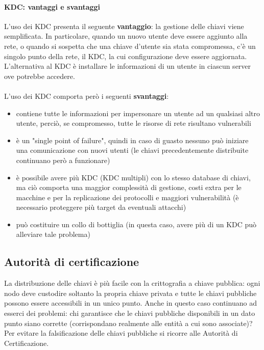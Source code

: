 \paragraph{KDC: vantaggi e svantaggi}
L'uso dei KDC presenta il seguente \textbf{vantaggio}: la gestione delle chiavi viene semplificata. In particolare, quando un nuovo utente deve essere aggiunto alla rete, o quando si sospetta che una chiave d'utente sia stata compromessa, c'è un singolo punto della rete, il KDC, la cui configurazione deve essere aggiornata. L'alternativa al KDC è installare le informazioni di un utente in ciascun server ove potrebbe accedere. \\ \\
L'uso dei KDC comporta però i seguenti \textbf{svantaggi}: 
\begin{itemize}
	\item contiene tutte le informazioni per impersonare un utente ad un qualsiasi altro utente, perciò, se compromesso, tutte le risorse di rete risultano vulnerabili
	\item è un "single point of failure", quindi in caso di guasto nessuno può iniziare una comunicazione con nuovi utenti (le chiavi precedentemente distribuite continuano però a funzionare)
	\item è possibile avere più KDC (KDC multipli) con lo stesso database di chiavi, ma ciò comporta una maggior complessità di gestione, costi extra per le macchine e per la replicazione dei protocolli e maggiori vulnerabilità (è necessario proteggere più target da eventuali attacchi)
	\item può costituire un collo di bottiglia (in questa caso, avere più di un KDC può alleviare tale problema)
\end{itemize}  

\subsection{Autorità di certificazione}
La distribuzione delle chiavi è più facile con la crittografia a chiave pubblica: ogni nodo deve custodire soltanto la propria chiave privata e tutte le chiavi pubbliche possono essere accessibili in un unico punto. Anche in questo caso continuano ad esserci dei problemi: chi garantisce che le chiavi pubbliche disponibili in un dato punto siano corrette (corrispondano realmente alle entità a cui sono associate)? Per evitare la falsificazione delle chiavi pubbliche si ricorre alle Autorità di Certificazione. \\

